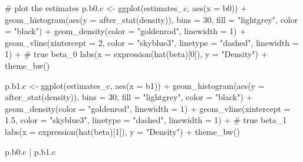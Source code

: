 \documentclass[
]{article}
\newenvironment{Shaded}{\begin{snugshade}}{\end{snugshade}}
\newcommand{\AttributeTok}[1]{\textcolor[rgb]{0.40,0.45,0.13}{#1}}
\newcommand{\CommentTok}[1]{\textcolor[rgb]{0.37,0.37,0.37}{#1}}
\newcommand{\DecValTok}[1]{\textcolor[rgb]{0.68,0.00,0.00}{#1}}
\newcommand{\FloatTok}[1]{\textcolor[rgb]{0.68,0.00,0.00}{#1}}
\newcommand{\FunctionTok}[1]{\textcolor[rgb]{0.28,0.35,0.67}{#1}}
\newcommand{\NormalTok}[1]{\textcolor[rgb]{0.00,0.23,0.31}{#1}}
\newcommand{\OtherTok}[1]{\textcolor[rgb]{0.00,0.23,0.31}{#1}}
\newcommand{\SpecialCharTok}[1]{\textcolor[rgb]{0.37,0.37,0.37}{#1}}
\newcommand{\StringTok}[1]{\textcolor[rgb]{0.13,0.47,0.30}{#1}}
\begin{document}
\begin{Shaded}
\begin{Highlighting}[numbers=left,,]
\CommentTok{\# plot the estimates}
\NormalTok{p.b0.c }\OtherTok{\textless{}{-}} \FunctionTok{ggplot}\NormalTok{(estimates\_c, }\FunctionTok{aes}\NormalTok{(}\AttributeTok{x =}\NormalTok{ b0)) }\SpecialCharTok{+}
  \FunctionTok{geom\_histogram}\NormalTok{(}\FunctionTok{aes}\NormalTok{(}\AttributeTok{y =} \FunctionTok{after\_stat}\NormalTok{(density)), }\AttributeTok{bins =} \DecValTok{30}\NormalTok{,}
                 \AttributeTok{fill =} \StringTok{"lightgrey"}\NormalTok{, }\AttributeTok{color =} \StringTok{"black"}\NormalTok{) }\SpecialCharTok{+}
  \FunctionTok{geom\_density}\NormalTok{(}\AttributeTok{color =} \StringTok{"goldenrod"}\NormalTok{, }\AttributeTok{linewidth =} \DecValTok{1}\NormalTok{) }\SpecialCharTok{+}
  \FunctionTok{geom\_vline}\NormalTok{(}\AttributeTok{xintercept =} \DecValTok{2}\NormalTok{, }\AttributeTok{color =} \StringTok{"skyblue3"}\NormalTok{,}
             \AttributeTok{linetype =} \StringTok{"dashed"}\NormalTok{, }\AttributeTok{linewidth =} \DecValTok{1}\NormalTok{) }\SpecialCharTok{+}       \CommentTok{\# true beta\_0}
  \FunctionTok{labs}\NormalTok{(}\AttributeTok{x =} \FunctionTok{expression}\NormalTok{(}\FunctionTok{hat}\NormalTok{(beta)[}\DecValTok{0}\NormalTok{]), }\AttributeTok{y =} \StringTok{"Density"}\NormalTok{) }\SpecialCharTok{+}
  \FunctionTok{theme\_bw}\NormalTok{()}

\NormalTok{p.b1.c }\OtherTok{\textless{}{-}} \FunctionTok{ggplot}\NormalTok{(estimates\_c, }\FunctionTok{aes}\NormalTok{(}\AttributeTok{x =}\NormalTok{ b1)) }\SpecialCharTok{+}
  \FunctionTok{geom\_histogram}\NormalTok{(}\FunctionTok{aes}\NormalTok{(}\AttributeTok{y =} \FunctionTok{after\_stat}\NormalTok{(density)), }\AttributeTok{bins =} \DecValTok{30}\NormalTok{,}
                 \AttributeTok{fill =} \StringTok{"lightgrey"}\NormalTok{, }\AttributeTok{color =} \StringTok{"black"}\NormalTok{) }\SpecialCharTok{+}
  \FunctionTok{geom\_density}\NormalTok{(}\AttributeTok{color =} \StringTok{"goldenrod"}\NormalTok{, }\AttributeTok{linewidth =} \DecValTok{1}\NormalTok{) }\SpecialCharTok{+}
  \FunctionTok{geom\_vline}\NormalTok{(}\AttributeTok{xintercept =} \FloatTok{1.5}\NormalTok{, }\AttributeTok{color =} \StringTok{"skyblue3"}\NormalTok{,}
             \AttributeTok{linetype =} \StringTok{"dashed"}\NormalTok{, }\AttributeTok{linewidth =} \DecValTok{1}\NormalTok{) }\SpecialCharTok{+}       \CommentTok{\# true beta\_1}
  \FunctionTok{labs}\NormalTok{(}\AttributeTok{x =} \FunctionTok{expression}\NormalTok{(}\FunctionTok{hat}\NormalTok{(beta)[}\DecValTok{1}\NormalTok{]), }\AttributeTok{y =} \StringTok{"Density"}\NormalTok{) }\SpecialCharTok{+}
  \FunctionTok{theme\_bw}\NormalTok{()}

\NormalTok{p.b0.c }\SpecialCharTok{|}\NormalTok{ p.b1.c}
\end{Highlighting}
\end{Shaded}
\end{document}
